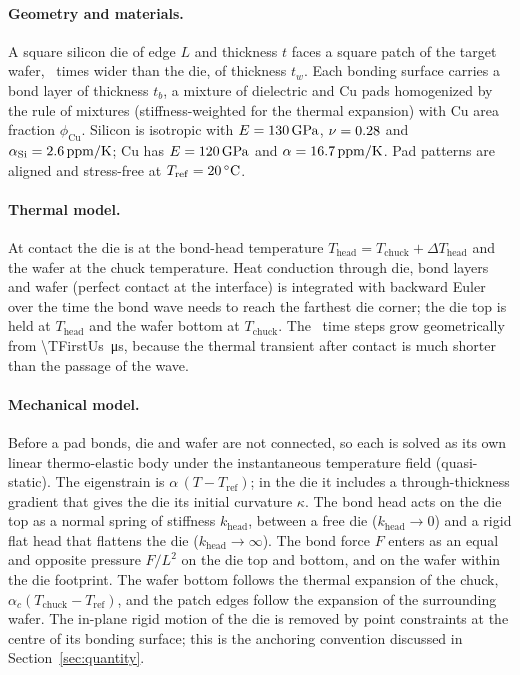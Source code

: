 \documentclass[11pt]{article}
\begin{document}
\paragraph{Geometry and materials.} A square silicon die of edge $L$ and thickness $t$ faces a square patch of the target
wafer, \WaferPatchFactor~times wider than the die, of thickness $t_w$. Each bonding surface carries a bond layer of
thickness $t_b$, a mixture of dielectric and Cu pads homogenized by the rule of mixtures (stiffness-weighted for the
thermal expansion) with Cu area fraction $\phi_{\mathrm{Cu}}$. Silicon is isotropic with $E=\SI{130}{\giga\pascal}$,
$\nu=0.28$ and $\alpha_{\mathrm{Si}}=\SI{2.6}{ppm/K}$; Cu has $E=\SI{120}{\giga\pascal}$ and
$\alpha=\SI{16.7}{ppm/K}$. Pad patterns are aligned and stress-free at $T_{\mathrm{ref}}=\SI{20}{\celsius}$.

\paragraph{Thermal model.} At contact the die is at the bond-head temperature
$T_{\mathrm{head}}=T_{\mathrm{chuck}}+\Delta T_{\mathrm{head}}$ and the wafer at the chuck temperature. Heat conduction
through die, bond layers and wafer (perfect contact at the interface) is integrated with backward Euler over the time the
bond wave needs to reach the farthest die corner; the die top is held at $T_{\mathrm{head}}$ and the wafer bottom at
$T_{\mathrm{chuck}}$. The \NTimeSteps~time steps grow geometrically from \SI{\TFirstUs}{\micro\second}, because the thermal
transient after contact is much shorter than the passage of the wave.

\paragraph{Mechanical model.} Before a pad bonds, die and wafer are not connected, so each is solved as its own linear
thermo-elastic body under the instantaneous temperature field (quasi-static). The eigenstrain is
$\alpha\,(T-T_{\mathrm{ref}})$; in the die it includes a through-thickness gradient that gives the die its initial
curvature $\kappa$. The bond head acts on the die top as a normal spring of stiffness $k_{\mathrm{head}}$, between a free
die ($k_{\mathrm{head}}\to0$) and a rigid flat head that flattens the die ($k_{\mathrm{head}}\to\infty$). The bond force
$F$ enters as an equal and opposite pressure $F/L^2$ on the die top and bottom, and on the wafer within the die
footprint. The wafer bottom follows the thermal expansion of the chuck, $\alpha_c(T_{\mathrm{chuck}}-T_{\mathrm{ref}})$,
and the patch edges follow the expansion of the surrounding wafer. The in-plane rigid motion of the die is removed by
point constraints at the centre of its bonding surface; this is the anchoring convention discussed in
Section~\ref{sec:quantity}.
\end{document}
